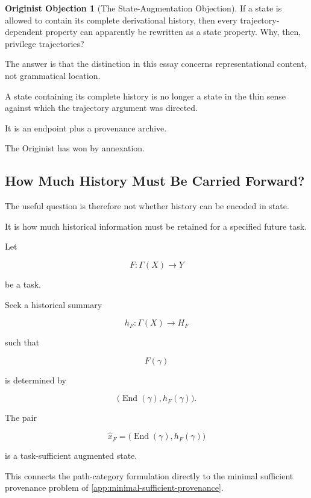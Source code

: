\documentclass[
  11pt,
  a4paper,
  DIV=12,
  BCOR=0mm,
  parskip=half-
]{scrartcl}
\newcommand{\End}{\operatorname{End}}
\theoremstyle{definition}
\newtheorem{objection}[definition]{Originist Objection}
\theoremstyle{plain}
\theoremstyle{remark}
\begin{document}
\begin{objection}[The State-Augmentation Objection]
If a state is allowed to contain its complete derivational history, then every
trajectory-dependent property can apparently be rewritten as a state property.
Why, then, privilege trajectories?
\end{objection}

The answer is that the distinction in this essay concerns representational
content, not grammatical location.

A state containing its complete history is no longer a state in the thin sense
against which the trajectory argument was directed.

It is an endpoint plus a provenance archive.

The Originist has won by annexation.


\subsection{How Much History Must Be Carried Forward?}
\label{app:minimal-state}

The useful question is therefore not whether history can be encoded in state.

It is how much historical information must be retained for a specified future
task.

Let

\[
  F:\Gamma(X)\to Y
\]

be a task.

Seek a historical summary

\[
  h_F:\Gamma(X)\to H_F
\]

such that

\[
  F(\gamma)
\]

is determined by

\[
  \bigl(
    \End(\gamma),
    h_F(\gamma)
  \bigr).
\]

The pair

\[
  \widehat x_F
  =
  \bigl(
    \End(\gamma),
    h_F(\gamma)
  \bigr)
\]

is a task-sufficient augmented state.

This connects the path-category formulation directly to the minimal sufficient
provenance problem of \cref{app:minimal-sufficient-provenance}.
\end{document}
